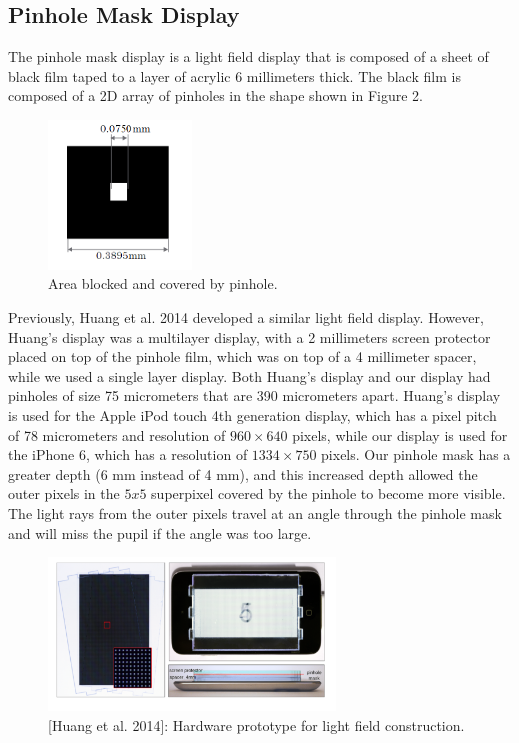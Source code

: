 \documentclass{acmsiggraph}
\begin{document}
\subsection{Pinhole Mask Display}

The pinhole mask display is a light field display that is composed of a sheet of black film taped to a layer of acrylic 6 millimeters thick. The black film is composed of a 2D array of pinholes in the shape shown in Figure 2.

\begin{figure}[ht]
  \centering
  \includegraphics[width=1.5in]{Pinhole_Mask2}
  \caption{Area blocked and covered by pinhole.}
  \label{fig:ferrari}
\end{figure}

Previously, Huang et al. 2014 developed a similar light field display. However, Huang's display was a multilayer display, with a 2 millimeters screen protector placed on top of the pinhole film, which was on top of a 4 millimeter spacer, while we used a single layer display. Both Huang's display and our display had pinholes of size 75 micrometers that are 390 micrometers apart. Huang's display is used for the Apple iPod touch 4th generation display, which has a pixel pitch of 78 micrometers and resolution of $960 \times 640$ pixels, while our display is used for the iPhone 6, which has a resolution of $1334 \times 750$ pixels. Our pinhole mask has a greater depth (6 mm instead of 4 mm), and this increased depth allowed the outer pixels in the $5x5$ superpixel covered by the pinhole to become more visible. The light rays from the outer pixels travel at an angle through the pinhole mask and will miss the pupil if the angle was too large.

\begin{figure}[ht]
  \centering
  \includegraphics[width=3.0in]{Pinhole_Mask}
  \caption{[Huang et al. 2014]: Hardware prototype for light field construction.}
  \label{fig:ferrari}
\end{figure}
\end{document}

